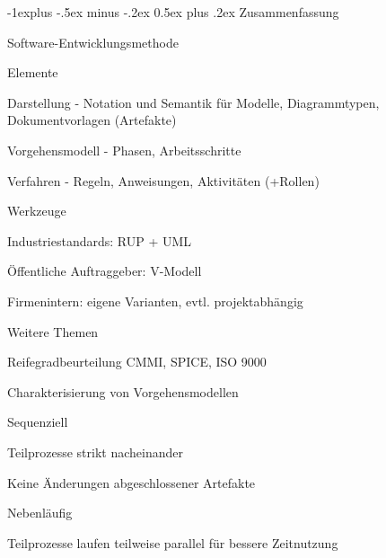 \documentclass[a4paper]{article}
\makeatletter
\renewcommand{\subsection}{\@startsection{subsection}{2}{0mm}%
                                {-1explus -.5ex minus -.2ex}%
                                {0.5ex plus .2ex}%
                                {\normalfont\normalsize\bfseries}}
\makeatother
\begin{document}
\begin{multicols}{3}
  \subsection{Zusammenfassung}
  \begin{itemize*}
    \item Software-Entwicklungsmethode
          \begin{itemize*}
            \item Elemente
                  \begin{itemize*}
                    \item Darstellung - Notation und Semantik für Modelle, Diagrammtypen, Dokumentvorlagen (Artefakte)
                    \item Vorgehensmodell - Phasen, Arbeitsschritte
                    \item Verfahren - Regeln, Anweisungen, Aktivitäten (+Rollen)
                    \item Werkzeuge
                  \end{itemize*}
            \item Industriestandards: RUP + UML
            \item Öffentliche Auftraggeber: V-Modell
            \item Firmenintern: eigene Varianten, evtl. projektabhängig
            \item Weitere Themen
                  \begin{itemize*}
                    \item Reifegradbeurteilung CMMI, SPICE, ISO 9000
                  \end{itemize*}
          \end{itemize*}
    \item Charakterisierung von Vorgehensmodellen
          \begin{itemize*}
            \item Sequenziell
                  \begin{itemize*}
                    \item Teilprozesse strikt nacheinander
                    \item Keine Änderungen abgeschlossener Artefakte
                  \end{itemize*}
            \item Nebenläufig
                  \begin{itemize*}
                    \item Teilprozesse laufen teilweise parallel für bessere Zeitnutzung

\end{itemize*}
\end{itemize*}
\end{itemize*}
\end{multicols}
\end{document}
